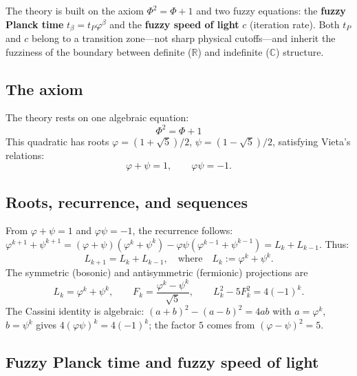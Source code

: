 \documentclass[12pt,a4paper]{article}
\begin{document}
\noindent The theory is built on the axiom $\Phi^2 = \Phi + 1$ and two fuzzy equations: the \textbf{fuzzy Planck time} $t_\beta = t_P\varphi^\beta$ and the \textbf{fuzzy speed of light} $c$ (iteration rate). Both $t_P$ and $c$ belong to a transition zone---not sharp physical cutoffs---and inherit the fuzziness of the boundary between definite ($\mathbb{R}$) and indefinite ($\mathbb{C}$) structure.

\subsection{The axiom}

The theory rests on one algebraic equation:
\begin{equation}
\boxed{\;\Phi^2 = \Phi + 1\;}
\label{eq:axiom}
\end{equation}
This quadratic has roots $\varphi = (1+\sqrt{5})/2$, $\psi = (1-\sqrt{5})/2$, satisfying Vieta's relations:
\begin{equation}
\varphi + \psi = 1, \qquad \varphi\psi = -1.
\label{eq:vieta}
\end{equation}

\subsection{Roots, recurrence, and sequences}

From $\varphi + \psi = 1$ and $\varphi\psi = -1$, the recurrence follows: $\varphi^{k+1} + \psi^{k+1} = (\varphi+\psi)(\varphi^k + \psi^k) - \varphi\psi(\varphi^{k-1} + \psi^{k-1}) = L_k + L_{k-1}$. Thus:
\begin{equation}
L_{k+1} = L_k + L_{k-1}, \quad \text{where} \quad L_k := \varphi^k + \psi^k.
\label{eq:recurrence}
\end{equation}
The symmetric (bosonic) and antisymmetric (fermionic) projections are
\begin{equation}
L_k = \varphi^k + \psi^k, \qquad F_k = \frac{\varphi^k - \psi^k}{\sqrt{5}}, \qquad L_k^2 - 5F_k^2 = 4(-1)^k.
\label{eq:Lk-Fk}
\end{equation}
The Cassini identity is algebraic: $(a+b)^2 - (a-b)^2 = 4ab$ with $a = \varphi^k$, $b = \psi^k$ gives $4(\varphi\psi)^k = 4(-1)^k$; the factor $5$ comes from $(\varphi - \psi)^2 = 5$.

\subsection{Fuzzy Planck time and fuzzy speed of light}
\end{document}
